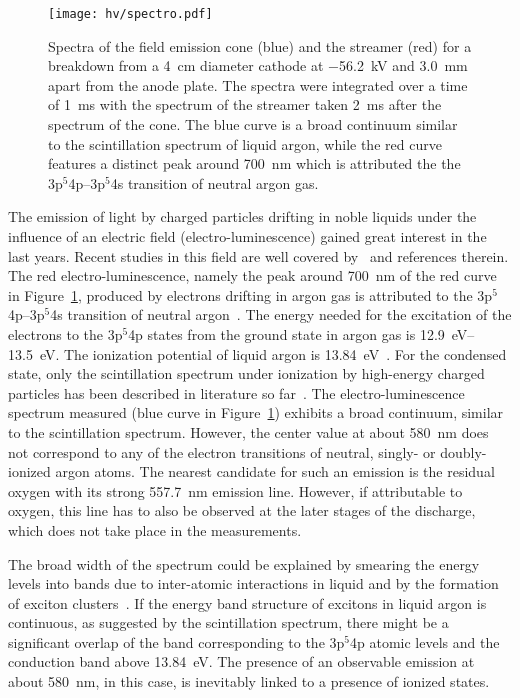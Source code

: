 \begin{figure}[htb]
	\centering
	\texttt{[image: hv/spectro.pdf]}
	\caption{Spectra of the field emission cone (blue) and the streamer (red) for a breakdown from a \SI{4}{\centi\metre} diameter cathode at \SI{-56.2}{\kilo\volt} and \SI{3.0}{\milli\metre} apart from the anode plate. The spectra were integrated over a time of \SI{1}{\milli\second} with the spectrum of the streamer taken \SI{2}{\milli\second} after the spectrum of the cone. The blue curve is a broad continuum similar to the scintillation spectrum of liquid argon, while the red curve features a distinct peak around \SI{700}{\nano\metre} which is attributed the the 3p$^5$4p--3p$^5$4s transition of neutral argon gas.}
	\label{fig:hv_spectro}
\end{figure}

The emission of light by charged particles drifting in noble liquids under the influence of an electric field (electro-luminescence) gained great interest in the last years.
Recent studies in this field are well covered by~\cite{buzulutskov1, buzulutskov2, buzulutskov3} and references therein.
The red electro-luminescence, namely the peak around \SI{700}{\nano\metre} of the red curve in Figure~\ref{fig:hv_spectro}, produced by electrons drifting in argon gas is attributed to the 3p$^5$4p--3p$^5$4s transition of neutral argon~\cite{Boffard}.
The energy needed for the excitation of the electrons to the 3p$^5$4p states from the ground state in argon gas is \SIrange{12.9}{13.5}{\electronvolt}.
The ionization potential of liquid argon is \SI{13.84}{\electronvolt}~\cite{2photonAbs}.
For the condensed state, only the scintillation spectrum under ionization by high-energy charged particles has been described in literature so far~\cite{Heindl}.
The electro-luminescence spectrum measured (blue curve in Figure~\ref{fig:hv_spectro}) exhibits a broad continuum, similar to the scintillation spectrum.
However, the center value at about \SI{580}{\nano\metre} does not correspond to any of the electron transitions of neutral, singly- or doubly-ionized argon atoms.
The nearest candidate for such an emission is the residual oxygen with its strong \SI{557.7}{\nano\metre} emission line.
However, if attributable to oxygen, this line has to also be observed at the later stages of the discharge, which does not take place in the measurements.

The broad width of the spectrum could be explained by smearing the energy levels into bands due to inter-atomic interactions in liquid and by the formation of exciton clusters~\cite{Bernstorff, Foerstel}.
If the energy band structure of excitons in liquid argon is continuous, as suggested by the scintillation spectrum, there might be a significant overlap of the band corresponding to the 3p$^5$4p atomic levels and the conduction band above \SI{13.84}{\electronvolt}.
The presence of an observable emission at about \SI{580}{\nano\metre}, in this case, is inevitably linked to a presence of ionized states.


